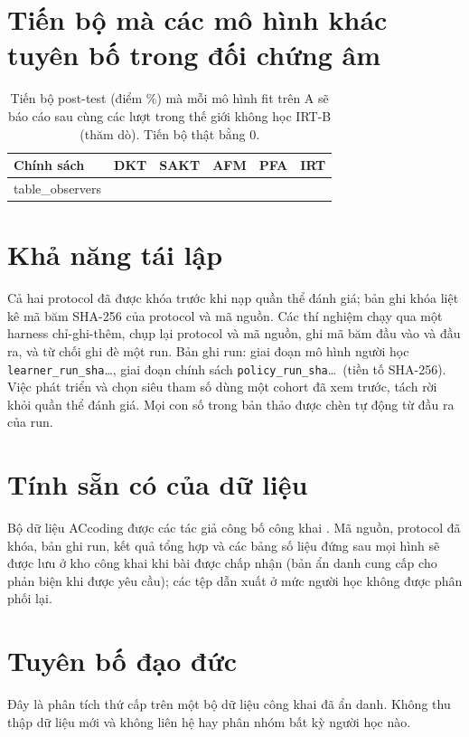 \documentclass[a4paper,preprint,12pt,authoryear]{elsarticle}
\begin{document}
\section{Tiến bộ mà các mô hình khác tuyên bố trong đối chứng âm}\label{app:observers}

\begin{table}[H]
\centering
\caption{Tiến bộ post-test (điểm \%) mà mỗi mô hình fit trên A sẽ báo cáo sau cùng các lượt trong thế giới không học IRT-B (thăm dò). Tiến bộ thật bằng 0.}
\label{tab:observers}
\small
\begin{tabular}{lrrrrr}
\toprule
Chính sách & DKT & SAKT & AFM & PFA & IRT \\
\midrule
{{table_observers}}
\bottomrule
\end{tabular}
\end{table}

\section{Khả năng tái lập}\label{app:repro}

Cả hai protocol đã được khóa trước khi nạp quần thể đánh giá; bản ghi khóa liệt kê mã băm SHA-256 của protocol và mã nguồn. Các thí nghiệm chạy qua một harness chỉ-ghi-thêm, chụp lại protocol và mã nguồn, ghi mã băm đầu vào và đầu ra, và từ chối ghi đè một run. Bản ghi run: giai đoạn mô hình người học \texttt{{{learner_run_sha}}}\ldots, giai đoạn chính sách \texttt{{{policy_run_sha}}}\ldots\ (tiền tố SHA-256). Việc phát triển và chọn siêu tham số dùng một cohort đã xem trước, tách rời khỏi quần thể đánh giá. Mọi con số trong bản thảo được chèn tự động từ đầu ra của run.

\section*{Tính sẵn có của dữ liệu}
Bộ dữ liệu ACcoding được các tác giả công bố công khai \citep{sun2026accodingdata,chen2024accoding}. Mã nguồn, protocol đã khóa, bản ghi run, kết quả tổng hợp và các bảng số liệu đứng sau mọi hình sẽ được lưu ở kho công khai khi bài được chấp nhận (bản ẩn danh cung cấp cho phản biện khi được yêu cầu); các tệp dẫn xuất ở mức người học không được phân phối lại.

\section*{Tuyên bố đạo đức}
Đây là phân tích thứ cấp trên một bộ dữ liệu công khai đã ẩn danh. Không thu thập dữ liệu mới và không liên hệ hay phân nhóm bất kỳ người học nào.
\end{document}
